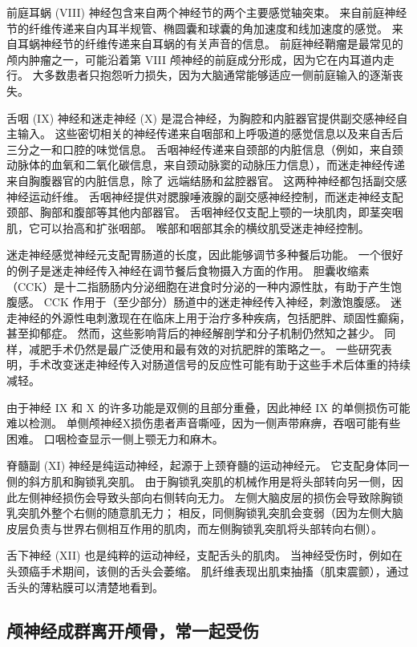 前庭耳蜗 (VIII) 神经包含来自两个神经节的两个主要感觉轴突束。
来自前庭神经节的纤维传递来自内耳半规管、椭圆囊和球囊的角加速度和线加速度的感觉。
来自耳蜗神经节的纤维传递来自耳蜗的有关声音的信息。
前庭神经鞘瘤是最常见的颅内肿瘤之一，可能沿着第 VIII 颅神经的前庭成分形成，因为它在内耳道内走行。 大多数患者只抱怨听力损失，因为大脑通常能够适应一侧前庭输入的逐渐丧失。


舌咽 (IX) 神经和迷走神经 (X) 是混合神经，为胸腔和内脏器官提供副交感神经自主输入。
这些密切相关的神经传递来自咽部和上呼吸道的感觉信息以及来自舌后三分之一和口腔的味觉信息。
舌咽神经传递来自颈部的内脏信息（例如，来自颈动脉体的血氧和二氧化碳信息，来自颈动脉窦的动脉压力信息），而迷走神经传递来自胸腹器官的内脏信息，除了 远端结肠和盆腔器官。
这两种神经都包括副交感神经运动纤维。
舌咽神经提供对腮腺唾液腺的副交感神经控制，而迷走神经支配颈部、胸部和腹部等其他内部器官。
舌咽神经仅支配上颚的一块肌肉，即茎突咽肌，它可以抬高和扩张咽部。
喉部和咽部其余的横纹肌受迷走神经控制。


迷走神经感觉神经元支配胃肠道的长度，因此能够调节多种餐后功能。
一个很好的例子是迷走神经传入神经在调节餐后食物摄入方面的作用。
胆囊收缩素（CCK）是十二指肠肠内分泌细胞在进食时分泌的一种内源性肽，有助于产生饱腹感。
CCK 作用于（至少部分）肠道中的迷走神经传入神经，刺激饱腹感。
迷走神经的外源性电刺激现在在临床上用于治疗多种疾病，包括肥胖、顽固性癫痫，甚至抑郁症。
然而，这些影响背后的神经解剖学和分子机制仍然知之甚少。
同样，减肥手术仍然是最广泛使用和最有效的对抗肥胖的策略之一。
一些研究表明，手术改变迷走神经传入对肠道信号的反应性可能有助于这些手术后体重的持续减轻。


由于神经 IX 和 X 的许多功能是双侧的且部分重叠，因此神经 IX 的单侧损伤可能难以检测。
单侧颅神经X损伤患者声音嘶哑，因为一侧声带麻痹，吞咽可能有些困难。
口咽检查显示一侧上颚无力和麻木。


脊髓副 (XI) 神经是纯运动神经，起源于上颈脊髓的运动神经元。
它支配身体同一侧的斜方肌和胸锁乳突肌。
由于胸锁乳突肌的机械作用是将头部转向另一侧，因此左侧神经损伤会导致头部向右侧转向无力。
左侧大脑皮层的损伤会导致除胸锁乳突肌外整个右侧的随意肌无力；
相反，同侧胸锁乳突肌会变弱（因为左侧大脑皮层负责与世界右侧相互作用的肌肉，而左侧胸锁乳突肌将头部转向右侧）。


舌下神经 (XII) 也是纯粹的运动神经，支配舌头的肌肉。
当神经受伤时，例如在头颈癌手术期间，该侧的舌头会萎缩。
肌纤维表现出肌束抽搐（肌束震颤），通过舌头的薄粘膜可以清楚地看到。



\subsection{颅神经成群离开颅骨，常一起受伤}

